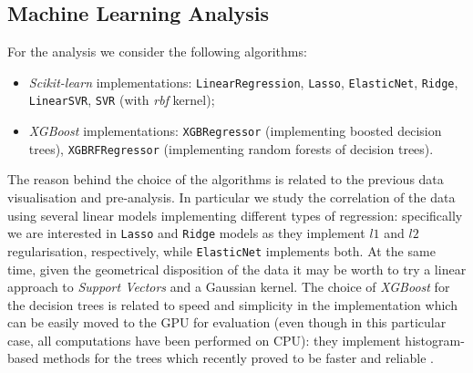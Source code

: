 \subsection{Machine Learning Analysis}
    For the analysis we consider the following algorithms:
    \begin{itemize}
        \item \textit{Scikit-learn} implementations:
            \subitem \texttt{LinearRegression},
            \subitem \texttt{Lasso},
            \subitem \texttt{ElasticNet},
            \subitem \texttt{Ridge},
            \subitem \texttt{LinearSVR},
            \subitem \texttt{SVR} (with \textit{rbf} kernel);
        \item \textit{XGBoost} implementations:
            \subitem \texttt{XGBRegressor} (implementing boosted decision trees),
            \subitem \texttt{XGBRFRegressor} (implementing random forests of decision trees).
    \end{itemize}
    The reason behind the choice of the algorithms is related to the previous data visualisation and pre-analysis. In particular we study the correlation of the data using several linear models implementing different types of regression: specifically we are interested in \texttt{Lasso} and \texttt{Ridge} models as they implement $l1$ and $l2$ regularisation, respectively, while \texttt{ElasticNet} implements both. At the same time, given the geometrical disposition of the data it may be worth to try a linear approach to \textit{Support Vectors} and a Gaussian kernel. The choice of \textit{XGBoost} for the decision trees is related to speed and simplicity in the implementation which can be easily moved to the GPU for evaluation (even though in this particular case, all computations have been performed on CPU): they implement histogram-based methods for the trees which recently proved to be faster and reliable \cite{ke2017lightgbm}.

